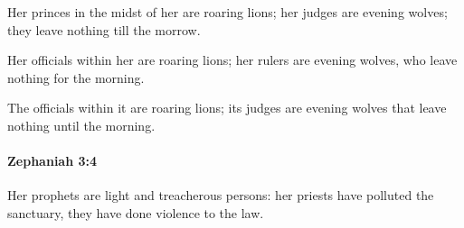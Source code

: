 			\begin{versebox}
					\item[BHS] 
					\item[LXX] 
					\item[ASV] Her princes in the midst of her are roaring lions; her judges are evening wolves; they leave nothing till the morrow.
					\item[NIV] Her officials within her are roaring lions; her rulers are evening wolves, who leave nothing for the morning.
					\item[NRSV] The officials within it are roaring lions; its judges are evening wolves that leave nothing until the morning.
			\end{versebox}

		\paragraph{Zephaniah 3:4} %
			\label{ZEPHANIAH-3-4}

			Her prophets are light and treacherous persons: her priests have polluted the sanctuary, they have done violence to the law.

